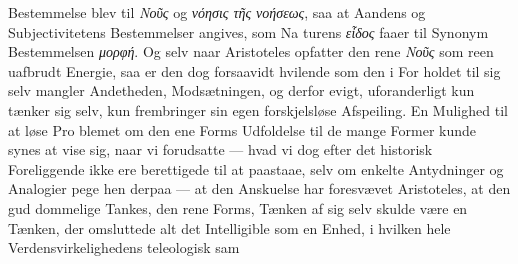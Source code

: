 \documentclass[12pt,a4paper]{book}
\newcommand{\gk}[1]{\textit{#1}}
\begin{document}
Bestemmelse blev til \gk{Νοῦς} og \gk{νόησις τῆς νοήσεως}, saa at
Aandens og Subjectivitetens Bestemmelser angives, som Na\-%
turens \gk{εἶδος} faaer til Synonym Bestemmelsen \gk{μορφή}. Og selv
naar Aristoteles opfatter den rene \gk{Νοῦς} som reen uafbrudt
Energie, saa er den dog forsaavidt hvilende som den i For\-%
holdet til sig selv mangler Andetheden, Modsætningen, og derfor
evigt, uforanderligt kun tænker sig selv, kun frembringer sin
egen forskjelsløse Afspeiling. En Mulighed til at løse Pro\-%
blemet om den ene Forms Udfoldelse til de mange Former
kunde synes at vise sig, naar vi forudsatte --- hvad vi dog efter
det historisk Foreliggende ikke ere berettigede til at paastaae,
selv om enkelte Antydninger og Analogier pege hen derpaa
--- at den Anskuelse har foresvævet Aristoteles, at den gud\-%
dommelige Tankes, den rene Forms, Tænken af sig selv skulde
være en Tænken, der omsluttede alt det Intelligible som en
Enhed, i hvilken hele Verdensvirkelighedens teleologisk sam\-%
\end{document}
